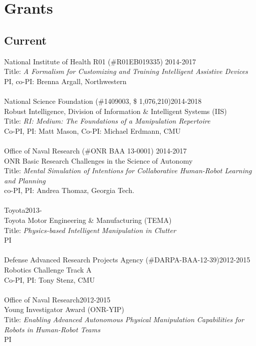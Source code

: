 \documentclass[10pt]{article}
\begin{document}
\section{Grants}

\subsection{Current}
\noindent
National Institute of Health R01 (\#R01EB019335) \hfill 2014-2017\\
Title: \textit{A Formalism for Customizing and Training Intelligent Assistive Devices}\\
PI, co-PI: Brenna Argall, Northwestern\\
\\
National Science Foundation (\#1409003, \$ 1,076,210)\hfill 2014-2018\\
Robust Intelligence, Division of Information \& Intelligent Systems (IIS)\\
Title: \textit{RI: Medium: The Foundations of a Manipulation Repertoire}\\
Co-PI, PI: Matt Mason, Co-PI: Michael Erdmann, CMU\\
\\
Office of Naval Research (\#ONR BAA 13-0001) \hfill 2014-2017\\
ONR Basic Research Challenges in the Science of Autonomy\\
Title: \textit{Mental Simulation of Intentions for Collaborative Human-Robot Learning and Planning}\\
co-PI, PI: Andrea Thomaz, Georgia Tech.	\\
\\
Toyota\hfill 2013-\\
Toyota Motor Engineering \& Manufacturing (TEMA)\\
Title: \textit{Physics-based Intelligent Manipulation in Clutter}\\
PI\\
\\
Defense Advanced Research Projects Agency (\#DARPA-BAA-12-39)\hfill 2012-2015\\
Robotics Challenge Track A\\
Co-PI, PI: Tony Stenz, CMU\\
\\
Office of Naval Research\hfill 2012-2015\\
Young Investigator Award (ONR-YIP)\\
Title: \textit{Enabling Advanced Autonomous Physical Manipulation Capabilities for Robots in Human-Robot Teams}\\
PI\\
\\
\end{document}
